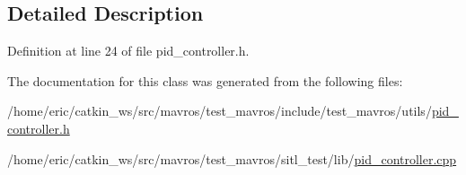 \subsection{Detailed Description}


Definition at line 24 of file pid\+\_\+controller.\+h.



The documentation for this class was generated from the following files\+:\begin{DoxyCompactItemize}
\item 
/home/eric/catkin\+\_\+ws/src/mavros/test\+\_\+mavros/include/test\+\_\+mavros/utils/\mbox{\hyperlink{pid__controller_8h}{pid\+\_\+controller.\+h}}\item 
/home/eric/catkin\+\_\+ws/src/mavros/test\+\_\+mavros/sitl\+\_\+test/lib/\mbox{\hyperlink{pid__controller_8cpp}{pid\+\_\+controller.\+cpp}}\end{DoxyCompactItemize}
